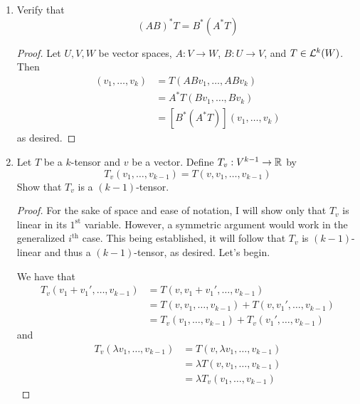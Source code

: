 \documentclass[../psets.tex]{subfiles}
\begin{document}
\begin{enumerate}[label={\textbf{1.3.\roman*.}}]
\begin{proof}
\begin{align*}
            &= (A^*T_1)(v_1,\dots,v_k)(A^*T_2)(v_{k+1},\dots,v_{k+\ell})\\
            &= [A^*(T_1)\otimes A^*(T_2)](v_1,\dots,v_{k+\ell})
        \end{align*}
        as desired.
    \end{proof}
    \item Verify that
    \begin{equation*}
        (AB)^*T = B^*(A^*T)
    \end{equation*}
    \begin{proof}
        Let $U,V,W$ be vector spaces, $A:V\to W$, $B:U\to V$, and $T\in\lin[k]{W}$. Then
        \begin{align*}
            [(AB)^*T](v_1,\dots,v_k) &= T(ABv_1,\dots,ABv_k)\\
            &= A^*T(Bv_1,\dots,Bv_k)\\
            &= [B^*(A^*T)](v_1,\dots,v_k)
        \end{align*}
        as desired.
    \end{proof}
    \setcounter{enumi}{6}
    \item Let $T$ be a $k$-tensor and $v$ be a vector. Define $T_v:V^{k-1}\to\R$ by
    \begin{equation*}
        T_v(v_1,\dots,v_{k-1}) = T(v,v_1,\dots,v_{k-1})
    \end{equation*}
    Show that $T_v$ is a $(k-1)$-tensor.
    \begin{proof}
        For the sake of space and ease of notation, I will show only that $T_v$ is linear in its $1^\text{st}$ variable. However, a symmetric argument would work in the generalized $i^\text{th}$ case. This being established, it will follow that $T_v$ is $(k-1)$-linear and thus a $(k-1)$-tensor, as desired. Let's begin.\par
        We have that
        \begin{align*}
            T_v(v_1+v_1',\dots,v_{k-1}) &= T(v,v_1+v_1',\dots,v_{k-1})\\
            &= T(v,v_1,\dots,v_{k-1})+T(v,v_1',\dots,v_{k-1})\\
            &= T_v(v_1,\dots,v_{k-1})+T_v(v_1',\dots,v_{k-1})
        \end{align*}
        and
        \begin{align*}
            T_v(\lambda v_1,\dots,v_{k-1}) &= T(v,\lambda v_1,\dots,v_{k-1})\\
            &= \lambda T(v,v_1,\dots,v_{k-1})\\
            &= \lambda T_v(v_1,\dots,v_{k-1})

\end{align*}
\end{proof}
\end{enumerate}
\end{document}
